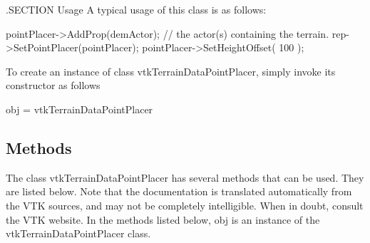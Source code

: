 .S\-E\-C\-T\-I\-O\-N Usage A typical usage of this class is as follows\-: \begin{DoxyVerb} pointPlacer->AddProp(demActor);    // the actor(s) containing the terrain.
 rep->SetPointPlacer(pointPlacer);
 pointPlacer->SetHeightOffset( 100 );\end{DoxyVerb}


To create an instance of class vtk\-Terrain\-Data\-Point\-Placer, simply invoke its constructor as follows \begin{DoxyVerb}  obj = vtkTerrainDataPointPlacer
\end{DoxyVerb}
 \hypertarget{vtkwidgets_vtkxyplotwidget_Methods}{}\subsection{Methods}\label{vtkwidgets_vtkxyplotwidget_Methods}
The class vtk\-Terrain\-Data\-Point\-Placer has several methods that can be used. They are listed below. Note that the documentation is translated automatically from the V\-T\-K sources, and may not be completely intelligible. When in doubt, consult the V\-T\-K website. In the methods listed below, {\ttfamily obj} is an instance of the vtk\-Terrain\-Data\-Point\-Placer class. 
